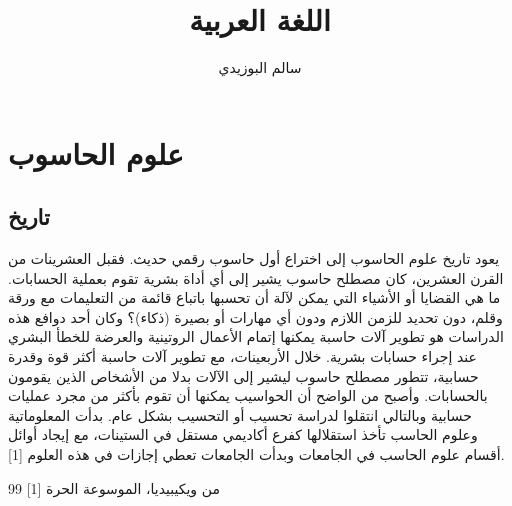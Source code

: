 \documentclass[11pt,a4paper]{report}
\title{
    \Huge\textsc{اللغة العربية}
}
\author{سالم البوزيدي}
\begin{document}
\maketitle
\tableofcontents
\chapter{علوم الحاسوب}
\section{تاريخ}
\begin{otherlanguage}{arabic}
يعود تاريخ علوم الحاسوب إلى اختراع أول حاسوب رقمي حديث. فقبل العشرينات من القرن العشرين، كان مصطلح حاسوب  يشير إلى أي أداة بشرية تقوم بعملية الحسابات. ما هي القضايا أو الأشياء التي يمكن لآلة أن تحسبها باتباع قائمة من التعليمات مع ورقة وقلم، دون تحديد للزمن اللازم ودون أي مهارات أو بصيرة (ذكاء)؟ وكان أحد دوافع هذه الدراسات هو تطوير آلات حاسبة  يمكنها إتمام الأعمال الروتينية والعرضة للخطأ البشري عند إجراء حسابات بشرية.
خلال الأربعينات، مع تطوير آلات حاسبة أكثر قوة وقدرة حسابية، تتطور مصطلح حاسوب ليشير إلى الآلات بدلا من الأشخاص الذين يقومون بالحسابات. وأصبح من الواضح أن الحواسيب يمكنها أن تقوم بأكثر من مجرد عمليات حسابية وبالتالي انتقلوا لدراسة تحسيب أو التحسيب بشكل عام. بدأت المعلوماتية وعلوم الحاسب تأخذ استقلالها كفرع أكاديمي مستقل في الستينات، مع إيجاد أوائل أقسام علوم الحاسب في الجامعات وبدأت الجامعات تعطي إجازات في هذه العلوم [1]. 
\end{otherlanguage}
\begin{thebibliography}{99}
   [1]
       من ويكيبيديا، الموسوعة الحرة
\end{thebibliography}
\end{document}
